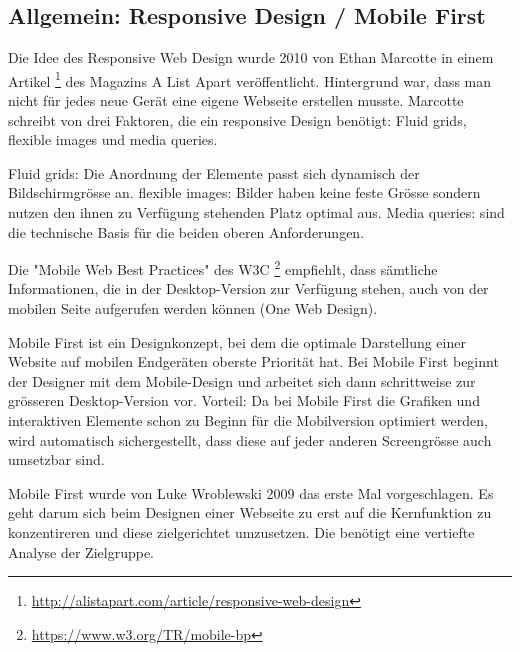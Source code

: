 \subsection{Allgemein: Responsive Design / Mobile First}

\newline
{}\newline
{}\newline

Die Idee des Responsive Web Design wurde 2010 von Ethan Marcotte in einem Artikel \footnote{ \url{http://alistapart.com/article/responsive-web-design}} des Magazins A List Apart veröffentlicht. Hintergrund war, dass man nicht für jedes neue Gerät eine eigene Webseite erstellen musste. Marcotte schreibt von drei Faktoren, die ein responsive Design benötigt: Fluid grids, flexible images und media queries.

Fluid grids: Die Anordnung der Elemente passt sich dynamisch der Bildschirmgrösse an.
flexible images: Bilder haben keine feste Grösse sondern nutzen den ihnen zu Verfügung stehenden Platz optimal aus.
Media queries: sind die technische Basis für die beiden oberen Anforderungen.

Die "Mobile Web Best Practices" des W3C \footnote{ \url{https://www.w3.org/TR/mobile-bp}} empfiehlt, dass sämtliche Informationen, die in der Desktop-Version zur Verfügung stehen, auch von der mobilen Seite aufgerufen werden können (One Web Design).

Mobile First ist ein Designkonzept, bei dem die optimale Darstellung einer Website auf mobilen Endgeräten oberste Priorität hat. Bei Mobile First beginnt der Designer mit dem Mobile-Design und arbeitet sich dann schrittweise zur grösseren Desktop-Version vor. Vorteil: Da bei Mobile First die Grafiken und interaktiven Elemente schon zu Beginn für die Mobilversion optimiert werden, wird automatisch sichergestellt, dass diese auf jeder anderen Screengrösse auch umsetzbar sind.

Mobile First wurde von Luke Wroblewski 2009 das erste Mal vorgeschlagen. Es geht darum sich beim Designen einer Webseite zu erst auf die Kernfunktion zu konzentireren und diese zielgerichtet umzusetzen. Die benötigt eine vertiefte Analyse der Zielgruppe.

